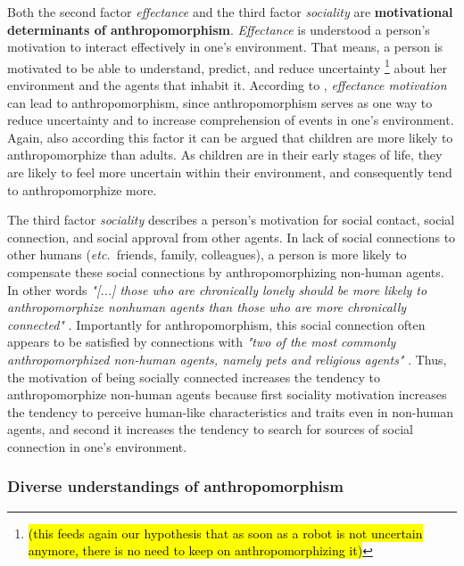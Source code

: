 \documentclass{frontiersSCNS} %
\newcommand{\etc}{{\textit{etc.~}}}
\begin{document}
Both the second factor \textit{effectance} and the third factor \textit{sociality} are \textbf{motivational determinants of anthropomorphism}. \textit{Effectance} is understood a person's motivation to interact effectively in one's environment. That means, a person is motivated to be able to understand, predict, and reduce uncertainty \footnote{\hl{(this feeds again our hypothesis that as soon as a robot is not uncertain anymore, there is no need to keep on anthropomorphizing it)}} about her environment and the agents that inhabit it. According to \cite{epley_seeing_2007}, \textit{effectance motivation} can lead to anthropomorphism, since anthropomorphism serves as one way to reduce uncertainty and to increase comprehension of events in one's environment. Again, also according this factor it can be argued that children are more likely to anthropomorphize than adults. As children are in their early stages of life, they are likely to feel more uncertain within their environment, and consequently tend to anthropomorphize more.

The third factor \textit{sociality} describes a person's motivation for social contact, social connection, and social approval from other agents. In lack of social connections to other humans (\etc friends, family, colleagues), a person is more likely to compensate these social connections by anthropomorphizing non-human agents. In other words \textit{"[...] those who are chronically lonely should be more likely to anthropomorphize nonhuman agents than those who are more chronically connected"} \citep{epley_seeing_2007}. Importantly for anthropomorphism, this social connection often appears to be satisfied by connections with \textit{"two of the most commonly anthropomorphized non-human agents, namely pets and religious agents"} \citep{epley_seeing_2007}. Thus, the motivation of being socially connected increases the tendency to anthropomorphize non-human agents because first sociality motivation increases the tendency to perceive human-like characteristics and traits even in non-human agents, and second it increases the tendency to search for sources of social connection in one's environment.


\subsubsection{Diverse understandings of anthropomorphism\\}
\end{document}
